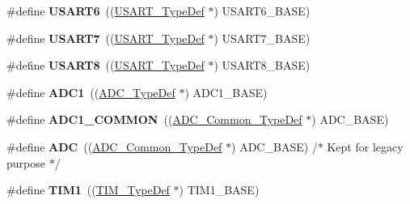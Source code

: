 \begin{DoxyCompactItemize}
\item 
\mbox{\label{group___peripheral__declaration_ga2dab39a19ce3dd05fe360dcbb7b5dc84}} 
\#define {\bfseries U\+S\+A\+R\+T6}~((\hyperlink{struct_u_s_a_r_t___type_def}{U\+S\+A\+R\+T\+\_\+\+Type\+Def} $\ast$) U\+S\+A\+R\+T6\+\_\+\+B\+A\+SE)
\item 
\mbox{\label{group___peripheral__declaration_ga5ccb06564cf2da2aa45ce492382f88ab}} 
\#define {\bfseries U\+S\+A\+R\+T7}~((\hyperlink{struct_u_s_a_r_t___type_def}{U\+S\+A\+R\+T\+\_\+\+Type\+Def} $\ast$) U\+S\+A\+R\+T7\+\_\+\+B\+A\+SE)
\item 
\mbox{\label{group___peripheral__declaration_ga91372b4c8cf79ad0895cbc38658d2d85}} 
\#define {\bfseries U\+S\+A\+R\+T8}~((\hyperlink{struct_u_s_a_r_t___type_def}{U\+S\+A\+R\+T\+\_\+\+Type\+Def} $\ast$) U\+S\+A\+R\+T8\+\_\+\+B\+A\+SE)
\item 
\mbox{\label{group___peripheral__declaration_ga90d2d5c526ce5c0a551f533eccbee71a}} 
\#define {\bfseries A\+D\+C1}~((\hyperlink{struct_a_d_c___type_def}{A\+D\+C\+\_\+\+Type\+Def} $\ast$) A\+D\+C1\+\_\+\+B\+A\+SE)
\item 
\mbox{\label{group___peripheral__declaration_gaf1919c64fc774aab31190346fd5457e2}} 
\#define {\bfseries A\+D\+C1\+\_\+\+C\+O\+M\+M\+ON}~((\hyperlink{struct_a_d_c___common___type_def}{A\+D\+C\+\_\+\+Common\+\_\+\+Type\+Def} $\ast$) A\+D\+C\+\_\+\+B\+A\+SE)
\item 
\mbox{\label{group___peripheral__declaration_ga54d148b91f3d356713f7e367a2243bea}} 
\#define {\bfseries A\+DC}~((\hyperlink{struct_a_d_c___common___type_def}{A\+D\+C\+\_\+\+Common\+\_\+\+Type\+Def} $\ast$) A\+D\+C\+\_\+\+B\+A\+SE) /$\ast$ Kept for legacy purpose $\ast$/
\item 
\mbox{\label{group___peripheral__declaration_ga2e87451fea8dc9380056d3cfc5ed81fb}} 
\#define {\bfseries T\+I\+M1}~((\hyperlink{struct_t_i_m___type_def}{T\+I\+M\+\_\+\+Type\+Def} $\ast$) T\+I\+M1\+\_\+\+B\+A\+SE)
\item 
\mbox{\label{group___peripheral__declaration_gad483be344a28ac800be8f03654a9612f}} 

\end{DoxyCompactItemize}
